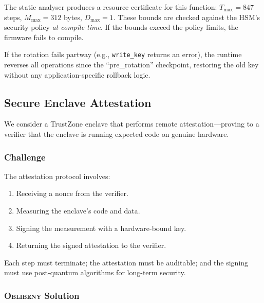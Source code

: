 \documentclass[11pt,a4paper]{article}
\newcommand{\obl}{\textsc{Obl\'{i}ben\'{y}}}
\begin{document}
The static analyser produces a resource certificate for this function:
$T_{\max} = 847$ steps, $M_{\max} = 312$ bytes, $D_{\max} = 1$.  These
bounds are checked against the HSM's security policy \emph{at compile time}.
If the bounds exceed the policy limits, the firmware fails to compile.

If the rotation fails partway (e.g., \texttt{write\_key} returns an error),
the runtime reverses all operations since the ``pre\_rotation'' checkpoint,
restoring the old key without any application-specific rollback logic.

\subsection{Secure Enclave Attestation}

We consider a TrustZone enclave that performs remote attestation---proving to
a verifier that the enclave is running expected code on genuine hardware.

\subsubsection{Challenge}

The attestation protocol involves:
\begin{enumerate}[nosep]
  \item Receiving a nonce from the verifier.
  \item Measuring the enclave's code and data.
  \item Signing the measurement with a hardware-bound key.
  \item Returning the signed attestation to the verifier.
\end{enumerate}

Each step must terminate; the attestation must be auditable; and the signing
must use post-quantum algorithms for long-term security.

\subsubsection{\obl{} Solution}
\end{document}

